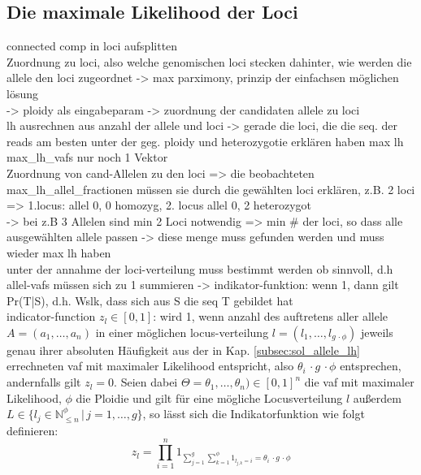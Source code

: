\subsection{Die maximale Likelihood der Loci}
connected comp in loci aufsplitten\\
Zuordnung zu loci, also welche genomischen loci stecken dahinter, wie werden die allele den loci zugeordnet -> max parximony, prinzip der einfachsen möglichen lösung \\
-> ploidy als eingabeparam -> zuordnung der candidaten allele zu loci\\
lh ausrechnen aus anzahl der allele und loci -> gerade die loci, die die seq. der reads am besten unter der geg. ploidy und heterozygotie erklären haben max lh
max\_lh\_vafs nur noch 1 Vektor\\
Zuordnung von cand-Allelen zu den loci => die beobachteten max\_lh\_allel\_fractionen müssen sie durch die gewählten loci erklären, z.B. 2 loci => 1.locus: allel 0, 0 homozyg, 2. locus allel 0, 2 heterozygot\\
-> bei z.B 3 Allelen sind min 2 Loci notwendig => min \# der loci, so dass alle ausgewählten allele passen -> diese menge muss gefunden werden und muss wieder max lh haben\\
unter der annahme der loci-verteilung muss bestimmt werden ob sinnvoll, d.h allel-vafs müssen sich zu 1 summieren -> indikator-funktion: wenn 1, dann gilt Pr(T|S), d.h. Wslk, dass sich aus S die seq T gebildet hat\\

indicator-function $z_{l} \in {[0,1]}$: wird 1, wenn anzahl des auftretens aller allele $A = (a_{1}, \dots, a_{n})$ in einer möglichen locus-verteilung $l = (l_{1}, \dots, l_{g \, \cdotp \phi})$ jeweils genau ihrer absoluten Häufigkeit aus der in Kap. \ref{subsec:sol_allele_lh} errechneten vaf mit maximaler Likelihood entspricht, also $\theta_{i} \, \cdotp g \, \cdotp \phi$ entsprechen, andernfalls gilt $ z_{l} = 0 $. Seien dabei  $\Theta=\theta_{1},\dots,\theta_{n}) \in [0,1]^n $ die vaf mit maximaler Likelihood, $ \phi $ die Ploidie und gilt für eine mögliche Locusverteilung $l$ außerdem $L \in \{l_{j} \in \mathds{N}_{\leq n}^\phi \, | \, j=1, \dots, g\}$, so lässt sich die Indikatorfunktion wie folgt definieren:
\begin{equation} \label{eqn:2-xxx4}
\tag{2-xxx4}
z_{l}=\prod_{i=1}^{n}1_{\sum_{j=1}^{g}\sum_{k=1}^{\phi}1_{l_{j,k}=i} = \theta_{i} \, \cdotp g \, \cdotp \phi}
\end{equation}

